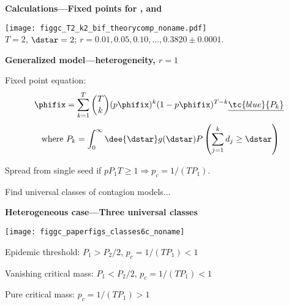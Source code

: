   \textbf{Calculations---Fixed points for , and }

  \begin{center}
      \texttt{[image: figgc\_T2\_k2\_bif\_theorycomp\_noname.pdf]}\\
      $T=2$, $\dstar=2$;
      \hfill
      $r=0.01, 0.05, 0.10,\ldots, 0.3820 \pm 0.0001$.
  \end{center}


  \textbf{Generalized model---heterogeneity, $r=1$}



  Fixed point equation:
  $$
  \phifix
  =
  \sum_{k=1}^{T}
  \binom{T}{k}
  (p\phifix)^{k}
  (1-p\phifix)^{T-k}
  \underline{\tc{blue}{P_k}}
  $$
  $$ \hfill \ \mbox{where} \
  P_k
  =
  \int_{0}^{\infty} \dee{\dstar}
  g(\dstar)
  P\left(
    \sum_{j=1}^{k} d_j \ge \dstar
    \right)
  $$

  Spread from single seed if $p P_1 T \ge 1 \Rightarrow p_c = 1/(TP_1)$.

  Find \underline{} universal classes
  of contagion models...


  \textbf{Heterogeneous case---Three universal classes}

  \begin{center}
    \texttt{[image: figgc\_paperfigs\_classes6c\_noname]}
  \end{center}

  Epidemic threshold: \hfill $P_1 > P_2/2$, $p_c = 1/(TP_1) < 1$

  Vanishing critical mass: \hfill $P_1 < P_2/2$, $p_c = 1/(TP_1) < 1$

  Pure critical mass: \hfill $p_c = 1/(TP_1) > 1$



